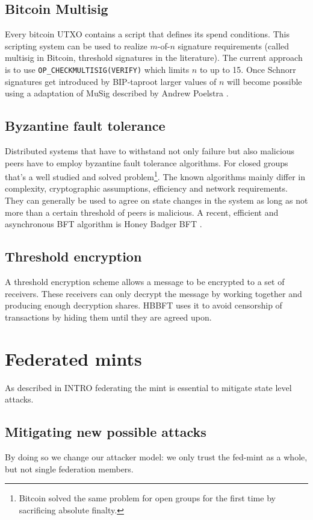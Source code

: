 \documentclass[10pt,a4paper,twocolumn]{article}
\begin{document}
\subsection{Bitcoin Multisig}
Every bitcoin UTXO contains a script that defines its spend conditions. This scripting system can be used to realize $m$-of-$n$ signature requirements (called multisig in Bitcoin, threshold signatures in the literature). The current approach is to use \texttt{OP\_CHECKMULTISIG(VERIFY)} which limits $n$ to up to 15.
Once Schnorr signatures \cite{Schnorr89} get introduced by BIP-taproot larger values of $n$ will become possible using a adaptation of MuSig \cite{MaxwellPSW19} described by Andrew Poelstra \cite{Poelstra19}.

\subsection{Byzantine fault tolerance}
Distributed systems that have to withstand not only failure but also malicious peers have to employ byzantine fault tolerance algorithms. For closed groups that's a well studied and solved problem\footnote{Bitcoin solved the same problem for open groups for the first time by sacrificing absolute finalty.}. The known algorithms mainly differ in complexity, cryptographic assumptions, efficiency and network requirements. They can generally be used to agree on state changes in the system as long as not more than a certain threshold of peers is malicious.
A recent, efficient and asynchronous BFT algorithm is Honey Badger BFT \cite{DBLP:journals/iacr/MillerXCSS16}.

\subsection{Threshold encryption}
A threshold encryption scheme allows a message to be encrypted to a set of receivers. These receivers can only decrypt the message by working together and producing enough decryption shares. HBBFT uses it to avoid censorship of transactions by hiding them until they are agreed upon.

\section{Federated mints}
As described in INTRO federating the mint is essential to mitigate state level attacks. %

\subsection{Mitigating new possible attacks}
By doing so we change our attacker model: we only trust the fed-mint as a whole, but not single federation members.
\end{document}
